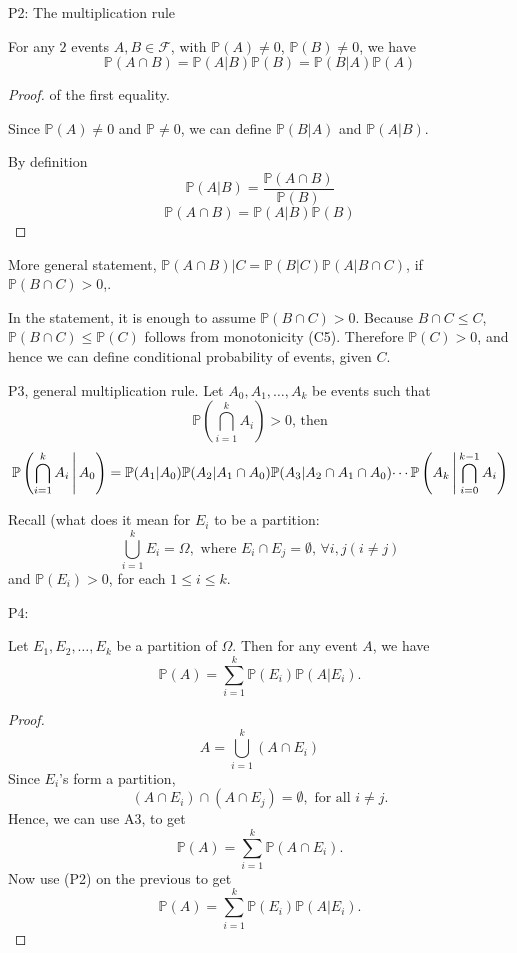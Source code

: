 \documentclass[10pt, a4paper]{article}
\begin{document}
P2: The multiplication rule

For any $2$ events $A, B \in \mathcal{F}$, with $\mathbb{P}(A) \neq 0$, $\mathbb{P}(B) \neq 0$, we have
\[
\mathbb{P}(A \cap B) = \mathbb{P}(A | B)\mathbb{P}(B) = \mathbb{P}(B | A)\mathbb{P}(A)
\]
\begin{proof}
    of the first equality.
    
    Since $\mathbb{P}(A) \neq 0$ and $\mathbb{P} \neq 0$, we can define $\mathbb{P}(B | A)$ and $\mathbb{P}(A | B)$.

    By definition
    \[
    \mathbb{P}(A | B) = \frac{\mathbb{P}(A \cap B)}{\mathbb{P}(B)}
    \]
    \[
    \mathbb{P}(A \cap B) = \mathbb{P}(A | B)\mathbb{P}(B)
    \]
\end{proof}

More general statement, $\mathbb{P}(A \cap B) | C = \mathbb{P}(B | C)\mathbb{P}(A | B \cap C)$, if $\mathbb{P}(B \cap C) > 0$,.

In the statement, it is enough to assume $\mathbb{P}(B \cap C) > 0$. Because $B \cap C \leq C$, $\mathbb{P}(B \cap C) \leq \mathbb{P}(C)$ follows from monotonicity (C5). Therefore $\mathbb{P}(C) > 0$, and hence we can define conditional probability of events, given $C$.

P3, general multiplication rule. Let $A_0, A_1, \dotsc, A_k$ be events such that
\[
\mathbb{P}\left(\bigcap_{i = 1}^{k}A_i\right) > 0\text{, then}
\]
\[
\mathbb{P}\left(\bigcap_{i = 1}^{k}A_i \,\middle|\, A_0\right) = \mathbb{P}(A_1 | A_0)\mathbb{P}(A_2 | A_1 \cap A_0)\mathbb{P}(A_3 | A_2 \cap A_1 \cap A_0) \dotsi \mathbb{P}\left(A_k \,\middle|\, \bigcap_{i = 0}^{k - 1}A_i\right)
\]

Recall (what does it mean for $E_i$ to be a partition:
\[
\bigcup_{i = 1}^{k}E_i = \Omega,\text{ where } E_i \cap E_j = \emptyset,\,\forall i, j (i \neq j)
\]
and $\mathbb{P}(E_i) > 0$, for each $1 \leq i \leq k$.

P4:
\begin{theorem}
    Let $E_1, E_2, \dotsc, E_k$ be a partition of $\Omega$. Then for any event $A$, we have
    \[
    \mathbb{P}(A) = \sum_{i = 1}^{k}\mathbb{P}(E_i)\mathbb{P}(A | E_i).
    \]
    \begin{proof}
        \[
        A = \bigcup_{i = 1}^{k}(A \cap E_i)
        \]
        Since $E_i$'s form a partition,
        \[
        (A \cap E_i) \cap (A \cap E_j) = \emptyset, \text{ for all } i \neq j.
        \]
        Hence, we can use A3, to get
        \[
        \mathbb{P}(A) = \sum_{i = 1}^{k}\mathbb{P}(A \cap E_i).
        \]
        Now use (P2) on the previous to get
        \[
        \mathbb{P}(A) = \sum_{i = 1}^{k}\mathbb{P}(E_i)\mathbb{P}(A | E_i).
        \]
    \end{proof}
\end{theorem}
\end{document}
